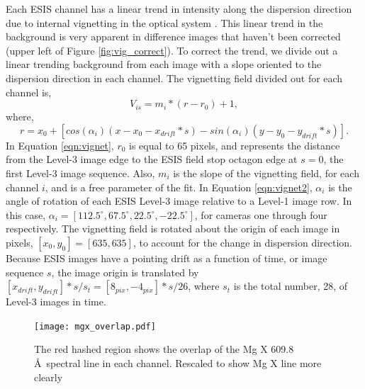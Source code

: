         Each ESIS channel has a linear trend in intensity along the dispersion direction due to internal vignetting in the optical system \citep{ESIS}.
        This linear trend in the background is very apparent in difference images that haven't been corrected (upper left of Figure \ref{fig:vig_correct}).
        To correct the trend, we divide out a linear trending background from each image with a slope oriented to the dispersion direction in each channel.
        The vignetting field divided out for each channel is,
        \begin{equation}
            V_{is} = m_{i} * (r - r_0) + 1,
            \label{eqn:vignet}
        \end{equation}
       	where,
       	\begin{equation}
        	r = x_0 + [cos(\alpha_i)(x-x_0-x_{drift}*s) - sin(\alpha_i)(y-y_0-y_{drift}*s)].
        	\label{eqn:vignet2}
       	\end{equation}
       	In Equation \ref{eqn:vignet}, $r_0$ is equal to 65 pixels, and represents the distance from the Level-3 image edge to the ESIS field stop octagon edge at $s = 0$, the first Level-3 image sequence.
       	Also, $m_{i}$ is the slope of the vignetting field, for each channel $i$, and is a free parameter of the fit.
        In Equation \ref{eqn:vignet2},  $\alpha_i$ is the angle of rotation of each ESIS Level-3 image relative to a Level-1 image row.
        In this case, $\alpha_i = [112.5^{\circ}, 67.5^{\circ}, 22.5^{\circ}, -22.5^{\circ}]$, for cameras one through four respectively.
        The vignetting field is rotated about the origin of each image in pixels, $[x_0, y_0] = [635,635]$, to account for the change in dispersion direction.
        Because ESIS images have a pointing drift as a function of time, or image sequence $s$, the image origin is translated by $[x_{drift},y_{drift}]*s/s_t = [8_{pix},-4_{pix}]*s/26$, where $s_t $ is the total number, 28, of Level-3 images in time.
        
        \begin{figure}[htb!]
        	\centering
        	\texttt{[image: mgx\_overlap.pdf]}
        	\caption{The red hashed region shows the overlap of the Mg X 609.8 \AA \ spectral line in each channel. Rescaled to show Mg X line more clearly}
        	\label{fig:mgx_overlap}
        \end{figure}
        
